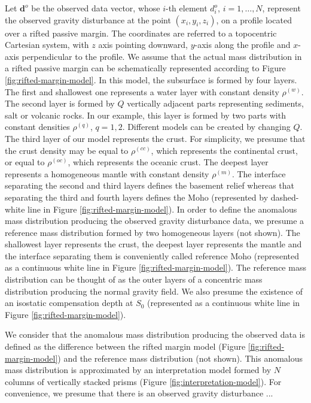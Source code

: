 \documentclass[manuscript]{geophysics}
\begin{document}
Let $\mathbf{d}^{o}$ be the observed data vector, whose $i$-th element $d^{o}_{i}$, 
$i = 1, \dots, N$, represent the observed gravity disturbance at the point 
$(x_{i}, y_{i}, z_{i})$, on a profile located over a rifted passive margin. The
coordinates are referred to a topocentric Cartesian system, with $z$ axis pointing
downward, $y$-axis along the profile and $x$-axis perpendicular to the profile. 
We assume that the actual mass distribution in a rifted passive margin can be 
schematically represented according to Figure \ref{fig:rifted-margin-model}. 
In this model, the subsurface is formed by four layers. 
The first and shallowest one represents a water layer with constant density
$\rho^{(w)}$. 
The second layer is formed by $Q$ vertically adjacent parts representing sediments,
salt or volcanic rocks.
In our example, this layer is formed by two parts with constant densities
$\rho^{(q)}$, $q = 1, 2$. Different models can be created by changing $Q$.
The third layer of our model represents the crust. For simplicity, we presume that the
crust density may be equal to $\rho^{(cc)}$, which
represents the continental crust, or equal to $\rho^{(oc)}$, which represents the
oceanic crust.
The deepest layer represents a homogeneous mantle with constant density
$\rho^{(m)}$. 
The interface separating the second and third layers defines the basement relief whereas
that separating the third and fourth layers defines the Moho (represented by
dashed-white line in Figure \ref{fig:rifted-margin-model}). 
In order to define the anomalous mass distribution producing the observed gravity
disturbance data, we presume a reference mass distribution formed by two homogeneous
layers (not shown). The shallowest layer represents 
the crust, the deepest layer represents the mantle and the interface separating them
is conveniently called reference Moho (represented as a continuous white line in Figure
\ref{fig:rifted-margin-model}).
The reference mass distribution can be thought of as the outer layers of a concentric
mass distribution producing the normal gravity field.
We also presume the existence of an isostatic compensation depth at $S_{0}$ 
(represented as a continuous white line in Figure \ref{fig:rifted-margin-model}).

We consider that the anomalous mass distribution producing the observed data
is defined as the difference between the rifted margin model (Figure
\ref{fig:rifted-margin-model}) and the reference mass distribution (not shown).
This anomalous mass distribution is approximated by an interpretation model 
formed by $N$ columns of vertically stacked prisms (Figure \ref{fig:interpretation-model}).
For convenience, we presume that there is an observed gravity disturbance ...
\end{document}
